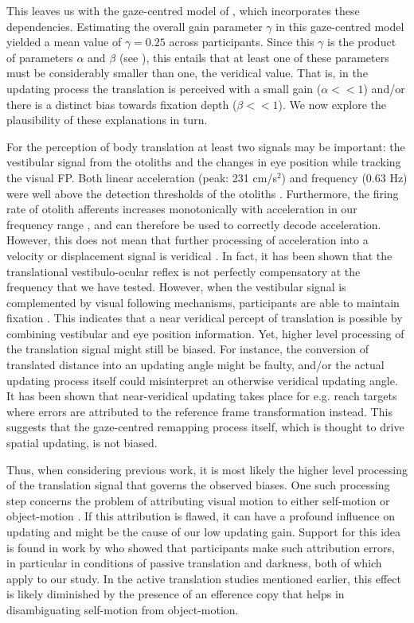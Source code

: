 This leaves us with the gaze-centred model of , which incorporates these dependencies. Estimating the overall gain parameter $\gamma$ in this gaze-centred model yielded a mean value of $\gamma = 0.25$ across participants. Since this $\gamma$ is the product of parameters $\alpha$ and $\beta$ (see ), this entails that at least one of these parameters must be considerably smaller than one, the veridical value. That is, in the updating process the translation is perceived with a small gain ($\alpha << 1$) and/or there is a distinct bias towards fixation depth ($\beta << 1$). We now explore the plausibility of these explanations in turn. 

For the perception of body translation at least two signals may be important: the vestibular signal from the otoliths and the changes in eye position while tracking the visual FP. Both linear acceleration (peak: 231 cm/s$^2$) and frequency (0.63 Hz) were well above the detection thresholds of the otoliths \cite{benson1986, yu2012}. Furthermore, the firing rate of otolith afferents increases monotonically with acceleration in our frequency range \cite{fernandez1976, yu2012}, and can therefore be used to correctly decode acceleration. However, this does not mean that further processing of acceleration into a velocity or displacement signal is veridical \cite{merfeld2005}. In fact, it has been shown that the translational vestibulo-ocular reflex is not perfectly compensatory at the frequency that we have tested. However, when the vestibular signal is complemented by visual following mechanisms, participants are able to maintain fixation \cite{medendorp2002, paige1998}. This indicates that a near veridical percept of translation is possible by combining vestibular and eye position information. Yet, higher level processing of the translation signal might still be biased. For instance, the conversion of translated distance into an updating angle might be faulty, and/or the actual updating process itself could misinterpret an otherwise veridical updating angle. It has been shown that near-veridical updating takes place for e.g. reach targets \cite{henriques1998, vanpelt2007} where errors are attributed to the reference frame transformation instead. This suggests that the gaze-centred remapping process itself, which is thought to drive spatial updating, is not biased.

Thus, when considering previous work, it is most likely the higher level processing of the translation signal that governs the observed biases. One such processing step concerns the problem of attributing visual motion to either self-motion or object-motion \cite{vonhelmholtz1867}. If this attribution is flawed, it can have a profound influence on updating and might be the cause of our low updating gain. Support for this idea is found in work by  who showed that participants make such attribution errors, in particular in conditions of passive translation and darkness, both of which apply to our study. In the active translation studies mentioned earlier, this effect is likely diminished by the presence of an efference copy that helps in disambiguating self-motion from object-motion.

